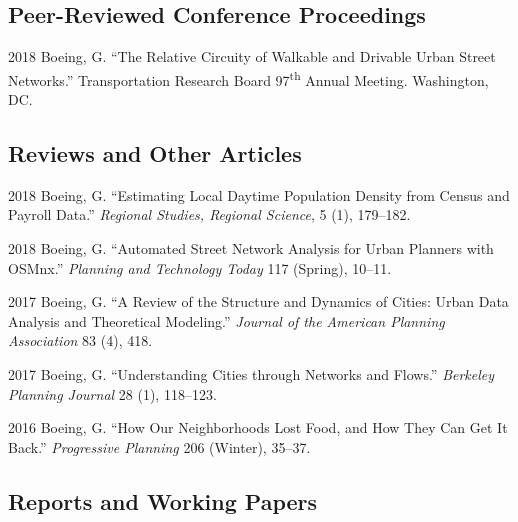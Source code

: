\documentclass[12pt,letterpaper]{report}
\begin{document}
\subsection*{Peer-Reviewed Conference Proceedings}

\begin{tablist}
	
	\item[2018] \tab Boeing, G. \enquote{The Relative Circuity of Walkable and Drivable Urban Street Networks.} Transportation Research Board 97\textsuperscript{th} Annual Meeting. Washington, DC.
	
\end{tablist}



\subsection*{Reviews and Other Articles}

\begin{tablist}
	
\item[2018] \tab Boeing, G. \enquote{Estimating Local Daytime Population Density from Census and Payroll Data.} \textit{Regional Studies, Regional Science}, 5 (1), 179--182.

\item[2018] \tab Boeing, G. \enquote{Automated Street Network Analysis for Urban Planners with OSMnx.} \textit{Planning and Technology Today} 117 (Spring), 10--11.
	
\item[2017] \tab Boeing, G. \enquote{A Review of the Structure and Dynamics of Cities: Urban Data Analysis and Theoretical Modeling.} \textit{Journal of the American Planning Association} 83 (4), 418.
	
\item[2017] \tab Boeing, G. \enquote{Understanding Cities through Networks and Flows.} \textit{Berkeley Planning Journal} 28 (1), 118--123.

\item[2016] \tab Boeing, G. \enquote{How Our Neighborhoods Lost Food, and How They Can Get It Back.} \textit{Progressive Planning} 206 (Winter), 35--37.
	
\end{tablist}



\subsection*{Reports and Working Papers}
\end{document}
